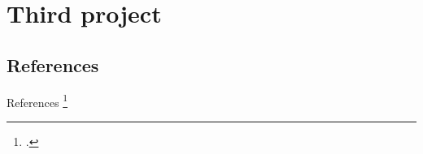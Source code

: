 \documentclass[xcolor=dvipsnames,aspectratio=169]{beamer}
\begin{document}
\section{Third project}
\subsection{References}
\begin{frame}{References}
    \blindtext \footcite{einstein}
\end{frame}
\end{document}
